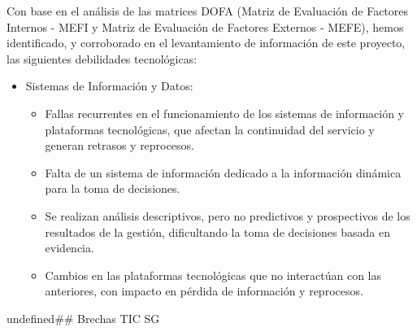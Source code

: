 \documentclass[
	a4paper, %
	12pt, %
]{include/CSSullivanBusinessReport}
\def\tightlist{}
\begin{document}
Con base en el análisis de las matrices DOFA (Matriz de Evaluación de
Factores Internos - MEFI y Matriz de Evaluación de Factores Externos -
MEFE), hemos identificado, y corroborado en el levantamiento de
información de este proyecto, las siguientes debilidades tecnológicas:

\begin{itemize}
\tightlist
\item
  Sistemas de Información y Datos:

  \begin{itemize}
  \tightlist
  \item
    Fallas recurrentes en el funcionamiento de los sistemas de
    información y plataformas tecnológicas, que afectan la continuidad
    del servicio y generan retrasos y reprocesos.
  \item
    Falta de un sistema de información dedicado a la información
    dinámica para la toma de decisiones.
  \item
    Se realizan análisis descriptivos, pero no predictivos y
    prospectivos de los resultados de la gestión, dificultando la toma
    de decisiones basada en evidencia.
  \item
    Cambios en las plataformas tecnológicas que no interactúan con las
    anteriores, con impacto en pérdida de información y reprocesos.
  \end{itemize}
\end{itemize}

undefined\#\# Brechas TIC SG
\end{document}
